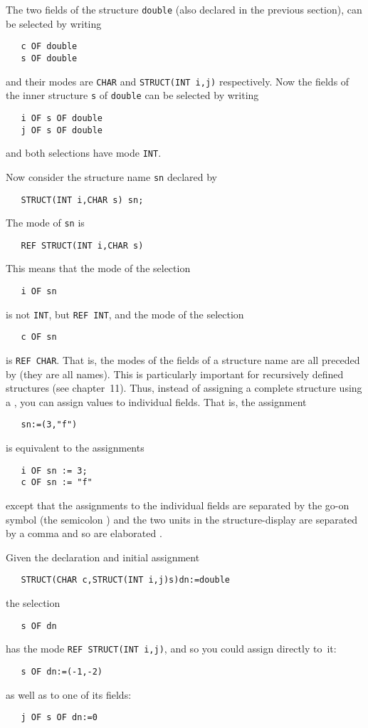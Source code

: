 The two fields of the structure \verb|double| (also declared in the
previous section), can be selected by writing
\begin{verbatim}
   c OF double
   s OF double
\end{verbatim}
\noindent
and their modes are \verb|CHAR| and \verb|STRUCT(INT i,j)|
respectively. Now the fields of the inner structure \verb|s| of
\verb|double| can be selected by writing
\begin{verbatim}
   i OF s OF double
   j OF s OF double
\end{verbatim}
\noindent
and both selections have mode \verb|INT|.

Now consider the structure name \verb|sn| declared by
\begin{verbatim}
   STRUCT(INT i,CHAR s) sn;
\end{verbatim}
\noindent
The mode of \verb|sn| is
\begin{verbatim}
   REF STRUCT(INT i,CHAR s)
\end{verbatim}
\noindent
This means that the mode of the selection
\begin{verbatim}
   i OF sn
\end{verbatim}
\noindent
is not \verb|INT|, but \verb|REF INT|, and the mode of the selection
\begin{verbatim}
   c OF sn
\end{verbatim}
\noindent
is \verb|REF CHAR|. That is, the modes of the fields of a structure
name are all preceded by  (they are all names).  This is
particularly important for recursively defined structures (see
chapter~11). Thus, instead of assigning a complete structure using a
, you can assign values to individual fields.
That is, the assignment
\begin{verbatim}
   sn:=(3,"f")
\end{verbatim}
\noindent
is equivalent to the assignments
\begin{verbatim}
   i OF sn := 3;
   c OF sn := "f"
\end{verbatim}
\noindent
except that the assignments to the individual fields are separated by
the go-on symbol (the semicolon \ixtt{;}) and the
two units in the structure-display are separated by a comma and so
are elaborated .

Given the declaration and initial assignment
\begin{verbatim}
   STRUCT(CHAR c,STRUCT(INT i,j)s)dn:=double
\end{verbatim}
\noindent
the selection
\begin{verbatim}
   s OF dn
\end{verbatim}
\noindent
has the mode \verb|REF STRUCT(INT i,j)|, and so you could assign
directly to~it:
\begin{verbatim}
   s OF dn:=(-1,-2)
\end{verbatim}
\noindent
as well as to one of its fields:
\begin{verbatim}
   j OF s OF dn:=0
\end{verbatim}

